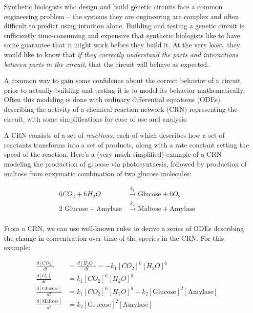 \documentclass[preprint,12pt]{elsarticle}
\begin{document}
Synthetic biologists who design and build genetic circuits face a common engineering problem -- the systems they are engineering are complex and often difficult to predict using intuition alone. Building and testing a genetic circuit is sufficiently time-consuming and expensive that synthetic biologists like to have some guarantee that it might work before they build it. At the very least, they would like to know that \emph{if they correctly understand the parts and interactions between parts in the circuit}, that the circuit will behave as expected. 

A common way to gain some confidence about the correct behavior of a circuit prior to actually building and testing it is to model its behavior mathematically. Often this modeling is done with ordinary differential equations (ODEs) describing the activity of a chemical reaction network (CRN) representing the circuit, with some simplifications for ease of use and analysis. 

A CRN consists of a set of \emph{reactions}, each of which describes how a set of reactants transforms into a set of products, along with a rate constant setting the speed of the reaction. Here's a (very much simplified) example of a CRN modeling the production of glucose via photosynthesis, followed by production of maltose from enzymatic combination of two glucose molecules:

\begin{align*}
	6CO_2 + 6 H_2O &\xrightarrow{k_1} \text{Glucose} + 6 O_2\\
	2 \text{ Glucose} + \text{Amylase} &\xrightarrow{k_2} \text{Maltose} + \text{Amylase}\\ 
\end{align*} 

From a CRN, we can use well-known rules to derive a series of ODEs describing the change in concentration over time of the species in the CRN. For this example:

\begin{align*}
	\frac{d[CO_2]}{dt} &= \frac{d[H_2O]}{dt} = -k_1[CO_2]^6[H_2O]^6\\
	\frac{d[O_2]}{dt} &= k_1[CO_2]^6[H_2O]^6 \\
	\frac{d[\text{Glucose}]}{dt} &= k_1[CO_2]^6[H_2O]^6 - k_2[\text{Glucose}]^2[\text{Amylase}]\\
	\frac{d[\text{Maltose}]}{dt} &= k_2[\text{Glucose}]^2[\text{Amylase}]\\
\end{align*}
\end{document}
